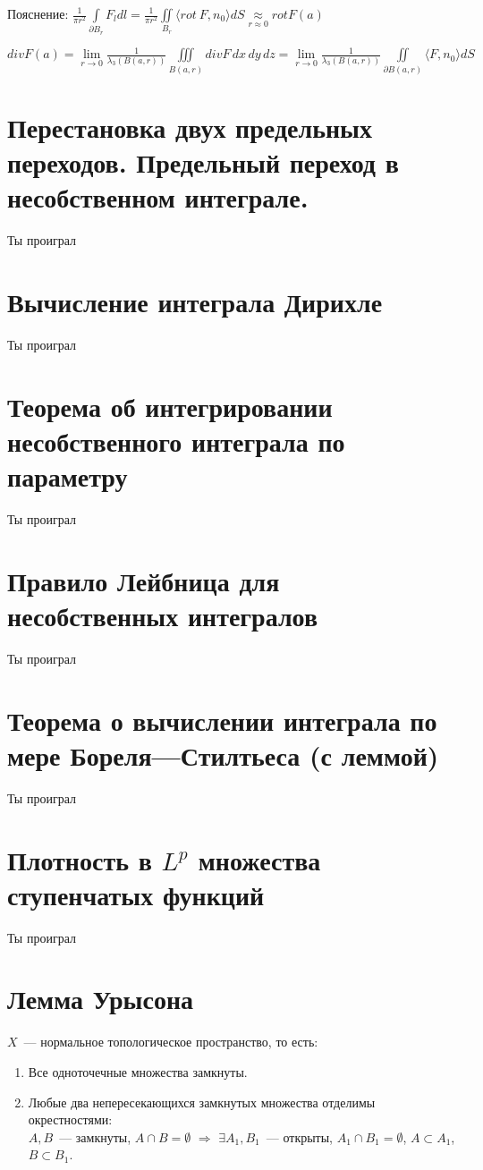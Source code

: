 	Пояснение: $ \frac{1}{\pi r^2} \int\limits_{\partial B_r} F_ldl =  \frac{1}{\pi r^2} \iint\limits_{B_r} \langle rot\ F, n_0 \rangle dS \underset{r \approx 0}{\approx} rot F(a)$
	


	$div F(a) = \lim\limits_{r\to 0} \frac{1}{\lambda_3(B(a,r))} \iiint\limits_{B(a,r)} div F \,dx\,dy\,dz = \lim\limits_{r\to 0} \frac{1}{\lambda_3(B(a,r))} \iint\limits_{\partial B(a,r)} \langle F, n_0 \rangle dS$

    \section{Перестановка двух предельных переходов. Предельный переход в несобственном интеграле.}
    Ты проиграл

    \section{Вычисление интеграла Дирихле}
    Ты проиграл

    \section{Теорема об интегрировании несобственного интеграла по параметру}
    Ты проиграл

    \section{Правило Лейбница для несобственных интегралов}
    Ты проиграл

    \section{Теорема о вычислении интеграла по мере Бореля---Стилтьеса (с леммой)}
    Ты проиграл

    \section{Плотность в $L^p$ множества ступенчатых функций}
    Ты проиграл

    \section{Лемма Урысона}
    $X$~--- нормальное топологическое пространство, то есть:
    \begin{enumerate}
        \item Все одноточечные множества замкнуты.
        \item Любые два непересекающихся замкнутых множества отделимы окрестностями:\\
        $A,B$~--- замкнуты, $A \cap B = \emptyset$ $\Rightarrow$ $\exists A_1,B_1$~--- открыты, $A_1 \cap B_1 = \emptyset$,
        $A \subset A_1$, $B \subset B_1$.
    \end{enumerate}

